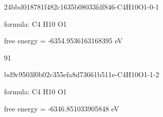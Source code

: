 \documentclass{article}
\begin{document}
\vspace{1cm}


24bbd018781f482c1635b08033fdf846-C4H10O1-0-1



formula: C4 H10 O1



free energy = -6354.9536163168395 eV

91

\vspace{1cm}


bd9c9503f0b02c355efa8d73661b511e-C4H10O1-1-2



formula: C4 H10 O1



free energy = -6346.851033905848 eV
\end{document}
